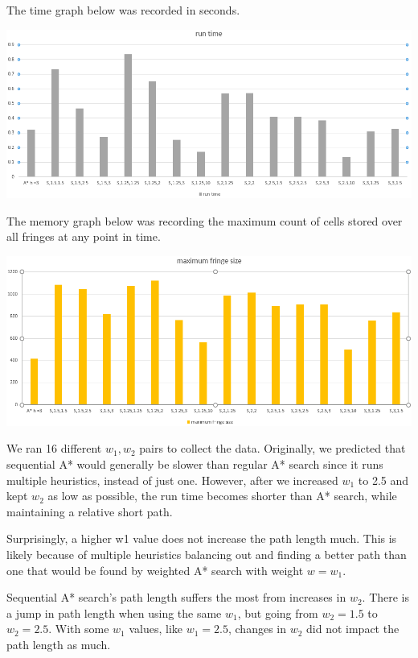 \documentclass[12pt, letterpaper]{article}
\begin{document}
\medskip

The time graph below was recorded in seconds.

\medskip

\noindent \includegraphics[scale=0.75]{"s-runtime"}

\medskip

The memory graph below was recording the maximum count of cells stored over all fringes at any point in time.

\medskip

\noindent \includegraphics[scale=0.75]{"s-mem"}

\medskip

We ran 16 different $w_1,w_2$ pairs to collect the data. Originally, we predicted that sequential A* would generally be slower than regular A* search since it runs multiple heuristics, instead of just one. However, after we increased $w_1$ to 2.5 and kept $w_2$ as low as possible, the run time becomes shorter than A* search, while maintaining a relative short path.

Surprisingly, a higher w1 value does not increase the path length much. This is likely because of multiple heuristics balancing out and finding a better path than one that would be found by weighted A* search with weight $w = w_1$.

Sequential A* search's path length suffers the most from increases in $w_2$. There is a jump in path length when using the same $w_1$, but going from $w_2 = 1.5$ to $w_2 = 2.5$. With some $w_1$ values, like $w_1 = 2.5$, changes in $w_2$ did not impact the path length as much. 
\end{document}
